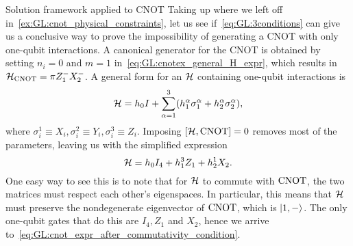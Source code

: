 \begin{examplebox}[label={ex:GL:cnot_with_conditions}]{Solution framework applied to CNOT}
Taking up where we left off in~\cref{ex:GL:cnot_physical_constraints}, let us see if~\cref{eq:GL:3conditions} can give us a conclusive way to prove the impossibility of generating a CNOT with only one-qubit interactions.
A canonical generator for the CNOT is obtained by setting $n_i=0$ and $m=1$ in~\cref{eq:GL:cnotex_general_H_expr}, which results in
${\mathcal{H}}_{\operatorname{CNOT}}=\pi Z_1^- X_2^-$.
A general form for an ${\mathcal{H}}$ containing one-qubit interactions is
\begin{equation}
    {\mathcal{H}} = h_0 I +
    \sum_{\alpha=1}^3 (h_1^\alpha\sigma_1^\alpha + h_2^\alpha\sigma_2^\alpha),
\end{equation}
where $\sigma_i^1\equiv X_i, \sigma_i^2\equiv Y_i, \sigma_i^3\equiv Z_i$.
Imposing $[{\mathcal{H}},\operatorname{CNOT}]=0$ removes most of the parameters, leaving us with the simplified expression
\begin{equation}
    {\mathcal{H}} = h_0 I_4 + h_1^3 Z_1 + h_2^1 X_2.
    \label{eq:GL:cnot_expr_after_commutativity_condition}
\end{equation}
One easy way to see this is to note that for ${\mathcal{H}}$ to commute with $\operatorname{CNOT}$, the two matrices must respect each other's eigenspaces. In particular, this means that ${\mathcal{H}}$ must preserve the nondegenerate eigenvector of $\operatorname{CNOT}$, which is $\ket{1,-}$.
The only one-qubit gates that do this are $I_4, Z_1$ and $X_2$, hence we arrive to~\cref{eq:GL:cnot_expr_after_commutativity_condition}.


\end{examplebox}
